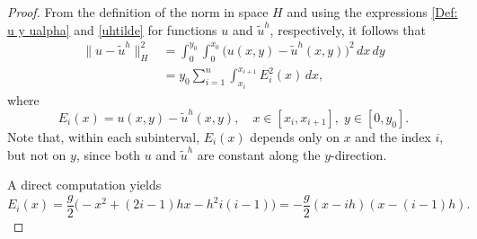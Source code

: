 \documentclass[10pt,a4paper]{amsart}
\newcommand{\dee}{d}
\begin{document}
\begin{proof} 
From the definition of the norm in space $H$ and using the expressions \eqref{Def: u y ualpha} and \eqref{uhtilde} for functions $u$ and ${\widetilde{u}^h}$, respectively, it follows that
\begin{equation}\label{cuenta-intermedia}
\begin{aligned}
\|u-{\widetilde{u}^h}\|_{H}^2
&= \int_0^{y_0} \int_0^{x_0} \big(u(x,y)-{\widetilde{u}^h}(x,y)\big)^2 \, \dee x \, \dee y \\[1ex]
&= y_0 \sum_{i=1}^n \int_{x_i}^{x_{i+1}} E_i^2(x)\, \dee x,
\end{aligned}
\end{equation}
where 
\[
E_i(x) = u(x,y) - {\widetilde{u}^h}(x,y), \quad x \in [x_i, x_{i+1}], \; y \in [0, y_0].
\] 
Note that, within each subinterval, $E_i(x)$ depends only on $x$ and the index $i$, but not on $y$, since both $u$ and ${\widetilde{u}^h}$ are constant along the $y$-direction.  

A direct computation yields
\begin{equation}\label{Ei}
E_i(x) = \frac{g}{2} \Big(-x^2 + (2i-1) h x - h^2 i(i-1) \Big) 
= -\frac{g}{2} (x - i h)(x - (i-1) h).
\end{equation}


\end{proof}
\end{document}
